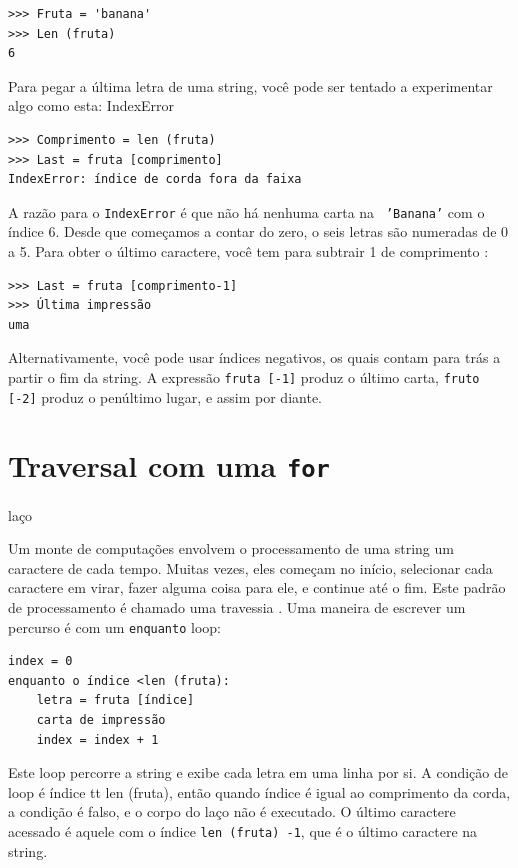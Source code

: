 \documentclass[10pt]{book}
\begin{document}
{\begin{verbatim}
>>> Fruta = 'banana'
>>> Len (fruta)
6
\end{verbatim}
%
Para pegar a última letra de uma string, você pode ser tentado a experimentar algo
como esta:
\index{} IndexError

\begin{verbatim}
>>> Comprimento = len (fruta)
>>> Last = fruta [comprimento]
IndexError: índice de corda fora da faixa
\end{verbatim}
%
A razão para o {\tt IndexError} é que não há nenhuma carta na {\tt
'Banana'} com o índice 6. Desde que começamos a contar do zero, o
seis letras são numeradas de 0 a 5. Para obter o último caractere, você tem
para subtrair 1 de comprimento {\tt}:

\begin{verbatim}
>>> Last = fruta [comprimento-1]
>>> Última impressão
uma
\end{verbatim}
%
Alternativamente, você pode usar índices negativos, os quais contam para trás a partir
o fim da string. A expressão {\tt fruta [-1]} produz o último
carta, {\tt fruto [-2]} produz o penúltimo lugar, e assim por diante.


\section{Traversal com uma {\tt for}} laço
\label{for}

Um monte de computações envolvem o processamento de uma string um caractere de cada
tempo. Muitas vezes, eles começam no início, selecionar cada caractere em
virar, fazer alguma coisa para ele, e continue até o fim. Este padrão de
processamento é chamado uma travessia {\bf}. Uma maneira de escrever um percurso
é com um {\tt enquanto} loop:

\begin{verbatim}
index = 0
enquanto o índice <len (fruta):
    letra = fruta [índice]
    carta de impressão
    index = index + 1
\end{verbatim}
%
Este loop percorre a string e exibe cada letra em uma linha por
si. A condição de loop é {índice tt \<len (fruta)}, então
quando {índice \tt} é igual ao comprimento da corda, a
condição é falso, e o corpo do laço não é executado. O
último caractere acessado é aquele com o índice {\tt len ​​(fruta) -1},
que é o último caractere na string.

}
\end{document}
